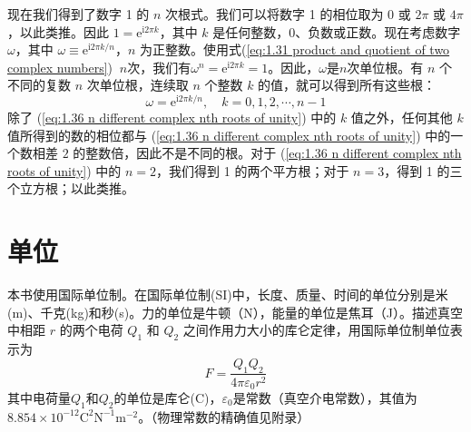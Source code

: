 	\indent 现在我们得到了数字 1 的 $n$ 次根式。我们可以将数字 1 的相位取为 0 或 $2\pi$ 或 $4\pi$，以此类推。因此 $1 = \mathrm{e}^{\mathrm{i}2\pi k}$，其中 $k$ 是任何整数，0、负数或正数。现在考虑数字 $\omega$，其中 $\omega \equiv \mathrm{e}^{\mathrm{i} 2\pi k /n}$，$n$ 为正整数。使用式(\ref{eq:1.31 product and quotient of two complex numbers}) $\:$$n$次，我们有$\omega^n = \mathrm{e}^{\mathrm{i}2\pi k} = 1$。因此，$\omega$是$n$次单位根。有 $n$ 个不同的复数 $n$ 次单位根，连续取 $n$ 个整数 $k$ 的值，就可以得到所有这些根：
	\begin{equation}
		\omega = \mathrm{e}^{\mathrm{i} 2\pi k /n}, \quad k = 0,1,2,\cdots , n-1
		\label{eq:1.36 n different complex nth roots of unity}
	\end{equation}
	除了 (\ref{eq:1.36 n different complex nth roots of unity}) 中的 $k$ 值之外，任何其他 $k$ 值所得到的数的相位都与 (\ref{eq:1.36 n different complex nth roots of unity}) 中的一个数相差 $2$ 的整数倍，因此不是不同的根。对于 (\ref{eq:1.36 n different complex nth roots of unity}) 中的 $n=2$，我们得到 1 的两个平方根；对于 $n=3$，得到 1 的三个立方根；以此类推。
	
	\section{单位}
	\label{sec:1.7 Units}
	本书使用国际单位制。在国际单位制(SI)中，长度、质量、时间的单位分别是米(m)、千克(kg)和秒(s)。力的单位是牛顿（N），能量的单位是焦耳（J）。描述真空中相距 $r$ 的两个电荷 $Q_1$ 和 $Q_2$ 之间作用力大小的库仑定律，用国际单位制单位表示为
	\begin{equation}
		\boxed{F = \frac{Q_1Q_2}{4\pi \varepsilon_0r^2}}
		\label{eq:1.37 coulomb's law}
	\end{equation}
	其中电荷量$Q_1$和$Q_2$的单位是库仑(C)，$\varepsilon_0$是常数（真空介电常数），其值为$8.854 \times 10^{-12} \mathrm{C}^2\mathrm{N}^{-1}\mathrm{m}^{-2}$。（物理常数的精确值见附录）
	
